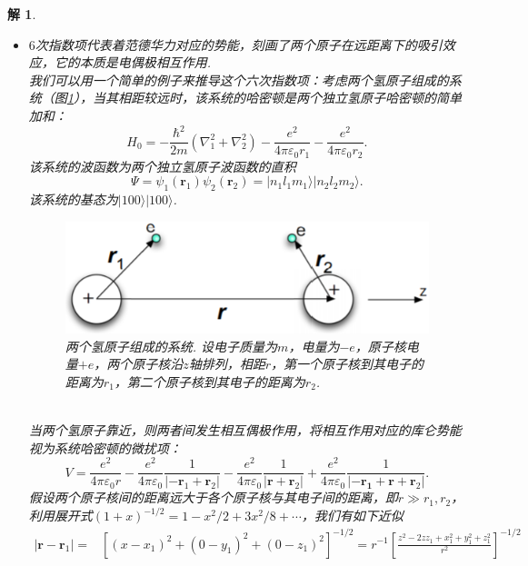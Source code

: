\documentclass[UTF8,10pt,a4paper]{article}
\theoremstyle{Problem}
\theoremstyle{Solution}
\newtheorem*{sol}{解}
\providecommand{\abs}[1]{\left\lvert#1\right\rvert}
\begin{document}
\begin{sol}
    \begin{itemize}
        \item[$\triangleright$] $6$次指数项代表着范德华力对应的势能，刻画了两个原子在远距离下的吸引效应，它的本质是电偶极相互作用.\\
        我们可以用一个简单的例子来推导这个六次指数项：考虑两个氢原子组成的系统（图\ref{1-1}），当其相距较远时，该系统的哈密顿是两个独立氢原子哈密顿的简单加和：
        \begin{equation}
            H_0=-\frac{\hbar^2}{2m}(\nabla_1^2+\nabla_2^2)-\frac{e^2}{4\pi\varepsilon_0r_1}-\frac{e^2}{4\pi\varepsilon_0r_2}.
        \end{equation}
        该系统的波函数为两个独立氢原子波函数的直积
        \begin{equation}
            \Psi=\psi_1(\bm{r}_1)\psi_2(\bm{r}_2)=\lvert n_1l_1m_1\rangle\lvert n_2l_2m_2\rangle.
        \end{equation}
        该系统的基态为$\lvert 100\rangle\lvert 100\rangle$.
        \begin{figure}[h]
            \centering
            \includegraphics[width=.32\textwidth]{1-1.png}
            \caption{两个氢原子组成的系统. 设电子质量为$m$，电量为$-e$，原子核电量$+e$，两个原子核沿$z$轴排列，相距$r$，第一个原子核到其电子的距离为$r_1$，第二个原子核到其电子的距离为$r_2$.}
            \label{1-1}
        \end{figure}
        \\当两个氢原子靠近，则两者间发生相互偶极作用，将相互作用对应的库仑势能视为系统哈密顿的微扰项：
        \begin{equation}
            V=\frac{e^2}{4\pi\varepsilon_0r}-\frac{e^2}{4\pi\varepsilon_0}\frac{1}{\abs{-\bm{r}_1+\bm{r}_2}}-\frac{e^2}{4\pi\varepsilon_0}\frac{1}{\abs{\bm{r}+\bm{r}_2}}+\frac{e^2}{4\pi\varepsilon_0}\frac{1}{\abs{-\bm{r_1}+\bm{r}+\bm{r}_2}}.
        \end{equation}
        假设两个原子核间的距离远大于各个原子核与其电子间的距离，即$r\gg r_1,r_2$，利用展开式$(1+x)^{-1/2}=1-x^2/2+3x^2/8+\cdots$，我们有如下近似
        \begin{align}
            \nonumber\abs{\bm{r}-\bm{r}_1}=&[(x-x_1)^2+(0-y_1)^2+(0-z_1)^2]^{-1/2}=r^{-1}\left[\frac{z^2-2zz_1+x_1^2+y_1^2+z_1^2}{r^2}\right]^{-1/2}\\

\end{align}
\end{itemize}
\end{sol}
\end{document}
